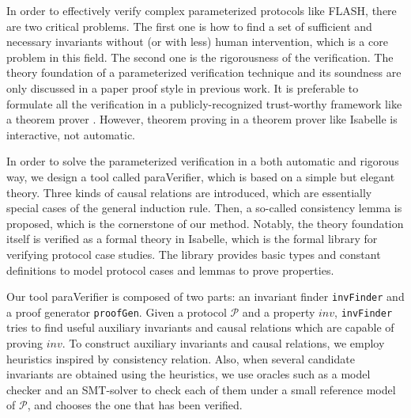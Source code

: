 \documentclass[conference]{IEEEtran}
\newcommand\cai[1]{\textcolor{blue}{ #1} }
\begin{document}
In order to effectively verify complex parameterized protocols like FLASH, there are two critical problems. %
The first one is  how to find a set of sufficient and necessary invariants without (or with less) human intervention, which is a core problem in this field. %
The second one is the rigorousness  of the verification. The theory foundation of a parameterized verification technique and its soundness are only discussed in a paper proof style in previous work.  %
It is preferable to formulate all the verification in a publicly-recognized trust-worthy framework like a theorem prover \cite{Chou2004}. However,
 theorem proving in a theorem prover like Isabelle is   interactive, not automatic.


In order to solve the parameterized
verification %
 in a both automatic and rigorous way, we design a tool called {\sf paraVerifier}, which is based on a simple but elegant theory.  Three kinds of causal
relations are introduced, which are
essentially special cases of the general induction rule. Then, a
so-called consistency lemma is proposed, which is the cornerstone of
our method. Notably, the theory foundation itself is  verified as a
formal theory in Isabelle, which is the formal library for verifying protocol case studies. The library provides basic types and constant definitions to model protocol cases and lemmas to prove  properties. %

Our tool {\sf paraVerifier} is composed of two parts:  an invariant finder {\tt invFinder}
and a proof generator {\tt proofGen}. %
Given a protocol $\mathcal{P}$ and a property $inv$, {\tt invFinder} tries to find useful auxiliary invariants and causal relations which are capable of proving $inv$. To construct auxiliary invariants and causal relations, we employ heuristics inspired by consistency relation. Also, when several candidate invariants are obtained using the heuristics, we use oracles such as a model checker and an SMT-solver to check each of them under a small reference model of $\mathcal{P}$, and chooses the one that has been verified.
\end{document}
